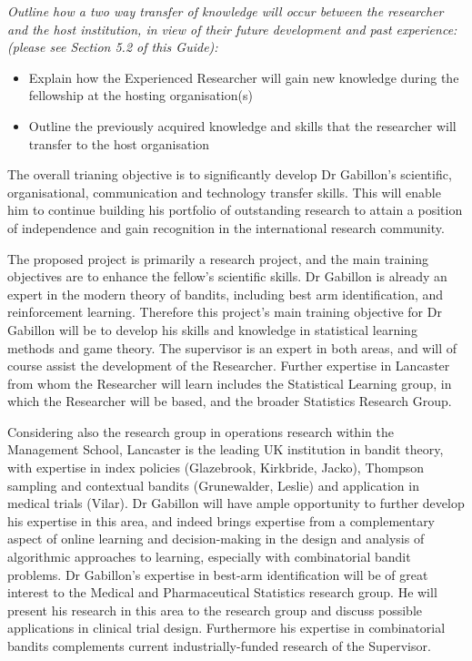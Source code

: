 \documentclass[a4paper,11pt]{article}
\begin{document}
{\em Outline how a two way transfer of knowledge will occur between the researcher and the host institution, in view of their future development and past experience: (please see Section 5.2 of this Guide):
\begin{itemize}
\item Explain how the Experienced Researcher will gain new knowledge during the fellowship at the hosting organisation(s)
\item Outline the previously acquired knowledge and skills that the researcher will transfer to the host organisation
\end{itemize}
}

The overall trianing objective is to significantly develop Dr Gabillon's scientific, organisational, communication and technology transfer skills.  This will enable him to continue building his portfolio of outstanding research to attain a position of independence and gain recognition in the international research community.

The proposed project is primarily a research project, and the main training objectives are to enhance the fellow's scientific skills. Dr Gabillon is already an expert in the modern theory of bandits, including best arm identification, and reinforcement learning.  Therefore this project's main training objective for Dr Gabillon will be to develop his skills and knowledge in statistical learning methods and game theory.  The supervisor is an expert in both areas, and will of course assist the development of the Researcher.  Further expertise in Lancaster from whom the Researcher will learn includes the Statistical Learning group, in which the Researcher will be based, and the broader Statistics Research Group.

Considering also the research group in operations research within the Management School, Lancaster is the leading UK institution in bandit theory, with expertise in index policies (Glazebrook, Kirkbride, Jacko), Thompson sampling and contextual bandits (Grunewalder, Leslie) and application in medical trials (Vilar). Dr Gabillon will have ample opportunity to further develop his expertise in this area, and indeed brings expertise from a complementary aspect of online learning and decision-making in the design and analysis of algorithmic approaches to learning, especially with combinatorial bandit problems.   Dr Gabillon's expertise in best-arm identification will be of great interest to the Medical and Pharmaceutical Statistics research group.  He will present his research in this area to the research group and discuss possible applications in clinical trial design.  Furthermore his expertise in combinatorial bandits complements current industrially-funded research of the Supervisor.
\end{document}
